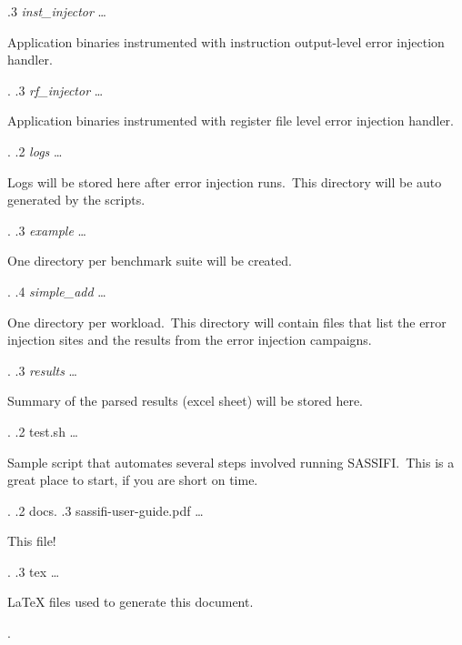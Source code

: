 {.3 {\it inst\_injector} \ldots{} \begin{minipage}[t]{12cm} Application binaries instrumented with instruction output-level error injection handler.\  \end{minipage}.
.3 {\it rf\_injector} \ldots{} \begin{minipage}[t]{12cm} Application binaries instrumented with register file level error injection handler.\  \end{minipage}.
.2 {\it logs} \ldots{} \begin{minipage}[t]{12cm} Logs will be stored here after error injection runs.\ This directory will be auto generated by the scripts.\  \end{minipage}.
.3 {\it example} \ldots{} \begin{minipage}[t]{12cm} One directory per benchmark suite will be created.\  \end{minipage}.
.4 {\it simple\_add} \ldots{} \begin{minipage}[t]{12cm} One directory per workload.\ This directory will contain files that list the error injection sites and the results from the error injection campaigns.\  \end{minipage}.
.3 {\it results} \ldots{} \begin{minipage}[t]{12cm} Summary of the parsed results (excel sheet) will be stored here.\  \end{minipage}.
%	
.2 test.sh \ldots{} \begin{minipage}[t]{12cm} Sample script that automates several steps involved running SASSIFI.\ This is a great place to start, if you are short on time.\  \end{minipage}.
.2 docs.
.3 sassifi-user-guide.pdf \ldots{} \begin{minipage}[t]{12cm} This file!\ \end{minipage}.
.3 tex  \ldots{} \begin{minipage}[t]{12cm} LaTeX files used to generate this document.\ \end{minipage}.
}

